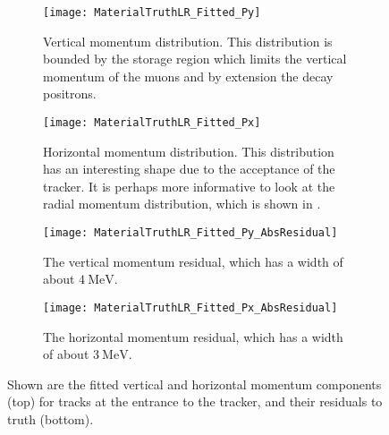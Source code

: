     \begin{figure}[]
    \centering
        \begin{subfigure}[t]{0.45\textwidth}
            \centering
            \texttt{[image: MaterialTruthLR\_Fitted\_Py]}
            \caption{Vertical momentum distribution. This distribution is bounded by the storage region which limits the vertical momentum of the muons and by extension the decay positrons.}
        \end{subfigure}
        \hspace{5mm}
        \begin{subfigure}[t]{0.45\textwidth}
            \centering
            \texttt{[image: MaterialTruthLR\_Fitted\_Px]}
            \caption{Horizontal momentum distribution. This distribution has an interesting shape due to the acceptance of the tracker. It is perhaps more informative to look at the radial momentum distribution, which is shown in .}
        \end{subfigure}
        \vspace{2mm}
        \begin{subfigure}[t]{0.45\textwidth}
            \centering
            \texttt{[image: MaterialTruthLR\_Fitted\_Py\_AbsResidual]}
            \caption{The vertical momentum residual, which has a width of about $\SI{4}{\MeV}$.}
        \end{subfigure}%
        \hspace{5mm}
        \begin{subfigure}[t]{0.45\textwidth}
            \centering
            \texttt{[image: MaterialTruthLR\_Fitted\_Px\_AbsResidual]}
            \caption{The horizontal momentum residual, which has a width of about $\SI{3}{\MeV}$.}
        \end{subfigure}%
    \caption[Fitted track vertical and horizontal momenta and corresponding residuals to truth]{Shown are the fitted vertical and horizontal momentum components (top) for tracks at the entrance to the tracker, and their residuals to truth (bottom).}
    \label{fig:MaterialFittedMomentaComponents}
    \end{figure}

